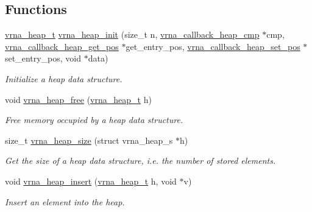 \subsection*{Functions}
\begin{DoxyCompactItemize}
\item 
\mbox{\hyperlink{group__heap__utils_ga341ea87a651145b986792f6eb3e679c3}{vrna\+\_\+heap\+\_\+t}} \mbox{\hyperlink{group__heap__utils_gafd02db4841338bad6f551e3e2bd2161f}{vrna\+\_\+heap\+\_\+init}} (size\+\_\+t n, \mbox{\hyperlink{group__heap__utils_gac70f1b16e617c57128b1ac9361529795}{vrna\+\_\+callback\+\_\+heap\+\_\+cmp}} $\ast$cmp, \mbox{\hyperlink{group__heap__utils_ga15f9e17d8168f2d7edc43a282ff44f5e}{vrna\+\_\+callback\+\_\+heap\+\_\+get\+\_\+pos}} $\ast$get\+\_\+entry\+\_\+pos, \mbox{\hyperlink{group__heap__utils_ga00acf19f3af4792fb2f3b1d01b32fc61}{vrna\+\_\+callback\+\_\+heap\+\_\+set\+\_\+pos}} $\ast$set\+\_\+entry\+\_\+pos, void $\ast$data)
\begin{DoxyCompactList}\small\item\em Initialize a heap data structure. \end{DoxyCompactList}\item 
void \mbox{\hyperlink{group__heap__utils_ga2a4915c6e66b8831644857df0715c3ce}{vrna\+\_\+heap\+\_\+free}} (\mbox{\hyperlink{group__heap__utils_ga341ea87a651145b986792f6eb3e679c3}{vrna\+\_\+heap\+\_\+t}} h)
\begin{DoxyCompactList}\small\item\em Free memory occupied by a heap data structure. \end{DoxyCompactList}\item 
size\+\_\+t \mbox{\hyperlink{group__heap__utils_ga5d84774d7d7f000ab05724d54984c2ed}{vrna\+\_\+heap\+\_\+size}} (struct vrna\+\_\+heap\+\_\+s $\ast$h)
\begin{DoxyCompactList}\small\item\em Get the size of a heap data structure, i.\+e. the number of stored elements. \end{DoxyCompactList}\item 
void \mbox{\hyperlink{group__heap__utils_ga91cf0042c894de44c4eb7b47707260a8}{vrna\+\_\+heap\+\_\+insert}} (\mbox{\hyperlink{group__heap__utils_ga341ea87a651145b986792f6eb3e679c3}{vrna\+\_\+heap\+\_\+t}} h, void $\ast$v)
\begin{DoxyCompactList}\small\item\em Insert an element into the heap. \end{DoxyCompactList}\item 

\end{DoxyCompactItemize}
